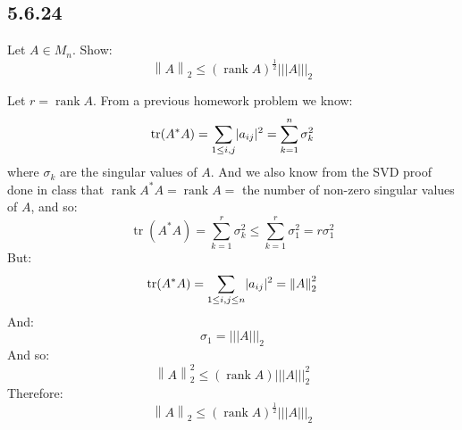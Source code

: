 \documentclass[letterpaper,12pt,fleqn]{article}
\newcommand{\norm}[1]{\left\lVert#1\right\rVert}
\newcommand{\mnorm}[1]{\left\lvert\left\lvert\left\lvert#1
  \right\rvert\right\rvert\right\rvert}
\renewcommand{\o}{\sigma}
\DeclareMathOperator{\rnk}{rank}
\DeclareMathOperator{\tr}{tr}
\begin{document}
\subsection*{5.6.24}

Let $A\in M_n$. Show:
\[\norm{A}_2\le(\rnk A)^{\frac{1}{2}}\mnorm{A}_2\]

Let $r=\rnk A$. From a previous homework problem we know:
\[\tr(A^*A)=\sum_{1\le i,j}\abs{a_{ij}}^2=\sum_{k=1}^n\o_k^2\]
where $\o_k$ are the singular values of $A$. And we also know from the SVD
proof done in class that $\rnk A^*A=\rnk A=$ the number of non-zero singular
values of $A$, and so:
\[\tr(A^*A)=\sum_{k=1}^r\o_k^2\le\sum_{k=1}^r\o_1^2=r\o_1^2\]
But:
\[\tr(A^*A)=\sum_{1\le i,j\le n}\abs{a_{ij}}^2=\norm{A}_2^2\]
And:
\[\o_1=\mnorm{A}_2\]
And so:
\[\norm{A}_2^2\le(\rnk A)\mnorm{A}_2^2\]
Therefore:
\[\norm{A}_2\le(\rnk A)^{\frac{1}{2}}\mnorm{A}_2\]
\end{document}
